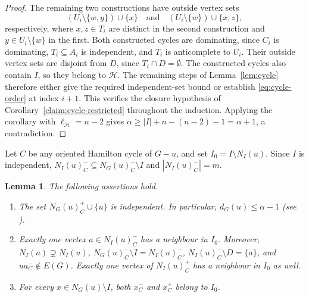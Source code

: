 \documentclass[11pt]{article}
\numberwithin{equation}{section}
\newtheorem{lemma}[theorem]{Lemma}
\theoremstyle{plain}
\theoremstyle{definition}
\theoremstyle{plain}
\begin{document}
\begin{proof}
The remaining two constructions have outside vertex sets
\[
 (U_i\setminus\{w,y\})\cup\{x\}
 \quad\text{and}\quad
 (U_i\setminus\{w\})\cup\{x,z\},
\]
respectively, where $x,z\in T_i$ are distinct in the second
construction and $y\in U_i\setminus\{w\}$ in the first.
Both constructed cycles are dominating, since $C_i$ is dominating,
$T_i\subseteq A_i$ is independent, and $T_i$ is anticomplete to $U_i$.
Their outside vertex sets are disjoint from $D$, since
$T_i\cap D=\emptyset$. The constructed cycles also contain $I$,
so they belong to $\mathcal H$.
The remaining steps of Lemma~\ref{lem:cycle} therefore either give the required
independent-set bound or establish \eqref{eq:cycle-order} at index $i+1$.
This verifies the closure hypothesis of Corollary~\ref{claim:cycle-restricted} throughout
the induction. Applying the corollary with $\ell_{\mathcal H}=n-2$
gives
 $\alpha\ge |I|+n-(n-2)-1=\alpha+1$,
a contradiction.
\end{proof}

Let $C$ be any oriented Hamilton cycle of $G-u$, and set
$I_0=I\setminus N_I(u)$. Since $I$ is independent,
$N_I(u)_C^-\subseteq N_G(u)_C^-\setminus I$ and
$|N_I(u)_C^-|=m$.

\begin{lemma}\label{lem:s3-structure}
The following assertions hold.
\begin{enumerate}[label=\textup{(\roman*)},nosep]
\item[\textup{(i)}]
The set $N_G(u)_C^+\cup\{u\}$ is independent. In particular,
$d_G(u)\leq\alpha-1$ (see \cite[Lemma~3.3 and its proof]{OtaSanka2022}).

\item[\textup{(ii)}]
Exactly one vertex $a\in N_I(u)_C^-$ has a neighbour in $I_0$.
Moreover, $N_I(a)\supsetneq N_I(u)$,
$N_G(u)_C^-\setminus I=N_I(u)_C^-$,
$N_I(u)_C^-\setminus D=\{a\}$, and
$ua_C^-\notin E(G)$.
Exactly one vertex of $N_I(u)_C^+$ has a neighbour in $I_0$ as well.

\item[\textup{(iii)}]
For every $x\in N_G(u)\setminus I$, both $x_C^-$ and $x_C^+$ belong
to $I_0$.
\end{enumerate}
\end{lemma}
\end{document}
